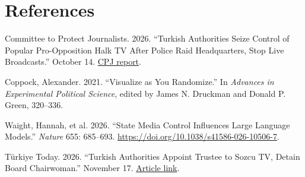 \documentclass[11pt,letterpaper]{article}
\begin{document}
\section*{References}

Committee to Protect Journalists. 2026.
``Turkish Authorities Seize Control of Popular Pro-Opposition
Halk TV After Police Raid Headquarters, Stop Live Broadcasts.''
October 14.
\href{https://cpj.org/2026/10/turkish-authorities-seize-control-of-popular-pro-opposition-halk-tv-after-police-raid-headquarters-stop-live-broadcasts/}
{CPJ report}.

Coppock, Alexander. 2021.
``Visualize as You Randomize.''
In \emph{Advances in Experimental Political Science},
edited by James N. Druckman and Donald P. Green, 320--336.

Waight, Hannah, et al. 2026.
``State Media Control Influences Large Language Models.''
\emph{Nature} 655: 685--693.
\url{https://doi.org/10.1038/s41586-026-10506-7}.

T\"urkiye Today. 2026.
``Turkish Authorities Appoint Trustee to Sozcu TV,
Detain Board Chairwoman.'' November 17.
\href{https://www.turkiyetoday.com/nation/turkish-authorities-appoint-trustee-to-sozcu-tv-detain-board-chairwoman-3232570}
{Article link}.
\end{document}
